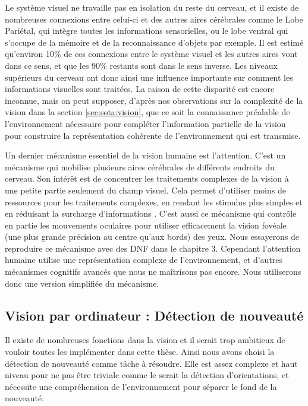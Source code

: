 	Le système visuel ne travaille pas en isolation du reste du cerveau, et il existe de nombreuses connexions entre celui-ci et des autres aires cérébrales comme le Lobe Pariétal, qui intègre toutes les informations sensorielles, ou le lobe ventral qui s'occupe de la mémoire et de la reconnaissance d'objets par exemple. Il est estimé qu'environ 10\% de ces connexions entre le système visuel et les autres aires vont dans ce sens, et que les 90\% restants sont dans le sens inverse. Les niveaux supérieurs du cerveau ont donc ainsi une influence importante sur comment les informations visuelles sont traitées. La raison de cette disparité est encore inconnue, mais on peut supposer, d'après nos observations sur la complexité de la vision dans la section \ref{sec:sota:vision}, que ce soit la connaissance préalable de l'environnement nécessaire pour compléter l'information partielle de la vision pour construire la représentation cohérente de l'environnement qui est transmise.

	Un dernier mécanisme essentiel de la vision humaine est l'attention. C'est un mécanisme qui mobilise plusieurs aires cérébrales de différents endroits du cerveau. Son intérêt est de concentrer les traitements complexes de la vision à une petite partie seulement du champ visuel. Cela permet d'utiliser moins de ressources pour les traitements complexes, en rendant les stimulus plus simples et en réduisant la surcharge d'informations \cite{evans2011visual}. C'est aussi ce mécanisme qui contrôle en partie les mouvements oculaires pour utiliser efficacement la vision fovéale (une plus grande précision au centre qu'aux bords) des yeux. Nous essayerons de reproduire ce mécanisme avec des DNF dans le chapitre 3. Cependant l'attention humaine utilise une représentation complexe de l'environnement, et d'autres mécanismes cognitifs avancés que nous ne maîtrisons pas encore. Nous utiliserons donc une version simplifiée du mécanisme.
	
\subsection{Vision par ordinateur : Détection de nouveauté}\label{sec:sota:computer_vis}

	Il existe de nombreuses fonctions dans la vision et il serait trop ambitieux de vouloir toutes les implémenter dans cette thèse. Ainsi nous avons choisi la détection de nouveauté comme tâche à résoudre. Elle est assez complexe et haut niveau pour ne pas être triviale comme le serait la détection d'orientations, et nécessite une compréhension de l'environnement pour séparer le fond de la nouveauté. 

